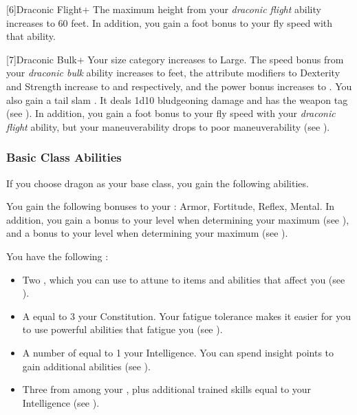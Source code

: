             [6]{Draconic Flight+} The maximum height from your \textit{draconic flight} ability increases to 60 feet.
            In addition, you gain a  foot bonus to your fly speed with that ability.

            [7]{Draconic Bulk+} Your size category increases to Large.
            The speed bonus from your \textit{draconic bulk} ability increases to  feet, the attribute modifiers to Dexterity and Strength increase to  and  respectively, and the power bonus increases to .
            You also gain a tail slam .
            It deals 1d10 bludgeoning damage and has the  weapon tag (see ).
            In addition, you gain a  foot bonus to your fly speed with your \textit{draconic flight} ability, but your maneuverability drops to poor maneuverability (see ).

        \subsubsection{Basic Class Abilities}
            If you choose dragon as your base class, you gain the following abilities.

            You gain the following bonuses to your :  Armor,  Fortitude,  Reflex,  Mental.
            In addition, you gain a  bonus to your level when determining your maximum  (see ), and a  bonus to your level when determining your maximum  (see ).

             You have the following :
            \begin{itemize}
                \item Two , which you can use to attune to items and abilities that affect you (see ).
                \item A  equal to 3 \add your Constitution.
                    Your fatigue tolerance makes it easier for you to use powerful abilities that fatigue you (see ).
                \item A number of  equal to 1 \add your Intelligence.
                    You can spend insight points to gain additional abilities (see ).
                \item Three  from among your , plus additional trained skills equal to your Intelligence (see ).
            \end{itemize}


